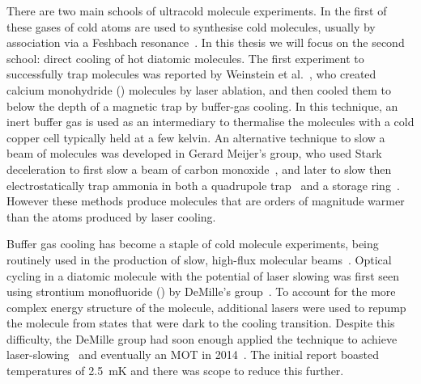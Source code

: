 There are two main schools of ultracold molecule experiments. In the first of
these gases of cold atoms are used to synthesise cold molecules, usually by
association via a Feshbach resonance~\cite{PhysRevA.89.033604}.  In this thesis
we will focus on the second school: direct cooling of hot diatomic molecules.
The first experiment to successfully trap molecules was reported by Weinstein
et al.~\cite{Weinstein1998}, who created calcium monohydride (\CaH{}) molecules
by laser ablation, and then cooled them to below the depth of a magnetic trap
by buffer-gas cooling. In this technique, an inert buffer gas is used as an
intermediary to thermalise the molecules with a cold copper cell typically held
at a few kelvin.
%
An alternative technique to slow a beam of molecules was developed in Gerard
Meijer's group, who used Stark deceleration to first slow a beam of carbon
monoxide~\cite{Bethlem1999}, and later to slow then electrostatically trap
ammonia in both a quadrupole trap~\cite{Bethlem2000} and a storage
ring~\cite{Crompvoets2001, Crompvoets2005}. However these methods produce
molecules that are orders of magnitude warmer than the atoms produced by laser
cooling.


Buffer gas cooling has become a staple of cold molecule experiments, being
routinely used in the production of slow, high-flux molecular
beams~\cite{Maxwell2005, Patterson2007, Barry2011}.  Optical cycling in a
diatomic molecule with the potential of laser slowing was first seen using
strontium monofluoride (\SrF{}) by DeMille's group~\cite{Shuman2009}. To
account for the more complex energy structure of the molecule, additional
lasers were used to repump the molecule from states that were dark to the
cooling transition.  Despite this difficulty, the DeMille group had soon enough
applied the technique to achieve laser-slowing~\cite{PhysRevLett.108.103002}
and eventually an \SrF{} MOT in 2014~\cite{Barry2014, PhysRevLett.116.063004}.
The initial report boasted temperatures of \SI{2.5}{\milli\kelvin} and
there was scope to reduce this further.

